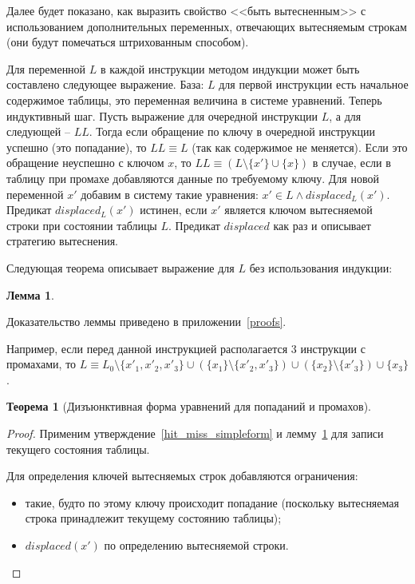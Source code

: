 \documentclass[14pt]{extreport}
\newtheorem{theorem}{Теорема}
\newtheorem{lemma}{Лемма}
\begin{document}
Далее будет показано, как выразить свойство <<быть вытесненным>> с использованием дополнительных переменных, отвечающих вытесняемым строкам (они будут помечаться штрихованным способом).

Для переменной $L$ в каждой инструкции методом индукции может быть
составлено следующее выражение. База: $L$ для первой инструкции есть
начальное содержимое таблицы, это переменная величина в
системе уравнений. Теперь индуктивный шаг. Пусть выражение для
очередной инструкции $L$, а для следующей -- $LL$. Тогда если
обращение по ключу в очередной инструкции успешно (это попадание), то $LL
\equiv L$ (так как содержимое не меняется). Если это обращение неуспешно с
ключом $x$, то $LL \equiv (L \setminus \{x'\} \cup \{x\})$ в случае, если
в таблицу при промахе добавляются данные по требуемому ключу.
Для новой переменной $x'$ добавим в систему такие уравнения: $x' \in
L \wedge displaced_L(x')$. Предикат $displaced_L(x')$ истинен, если $x'$ является ключом вытесняемой строки при состоянии таблицы $L$. Предикат $displaced$ как раз и описывает
стратегию вытеснения.

Следующая теорема описывает выражение для $L$ без использования
индукции:
\begin{lemma}\label{L_current} \LcurrentBody
\end{lemma}
Доказательство леммы приведено в приложении~\ref{proofs}.

Например, если перед данной инструкцией располагается 3 инструкции с
промахами, то $L \equiv L_0 \setminus \{x'_1, x'_2, x'_3\} \cup
(\{x_1\} \setminus \{x'_2, x'_3\}) \cup (\{x_2\} \setminus \{x'_3\})
\cup \{x_3\}$.

\begin{theorem}[Дизъюнктивная форма уравнений для попаданий и промахов]\label{hit_miss_equations} \HitMissEquations
\end{theorem}
\begin{proof}
Применим утверждение~\ref{hit_miss_simpleform} и лемму~\ref{L_current} для записи текущего
состояния таблицы.

Для определения ключей вытесняемых строк добавляются ограничения:
\begin{itemize}
    \item такие, будто по этому ключу происходит попадание (поскольку вытесняемая строка
принадлежит текущему состоянию таблицы);
    \item $displaced(x')$ по определению вытесняемой строки.
\end{itemize}
\end{proof}
\end{document}
